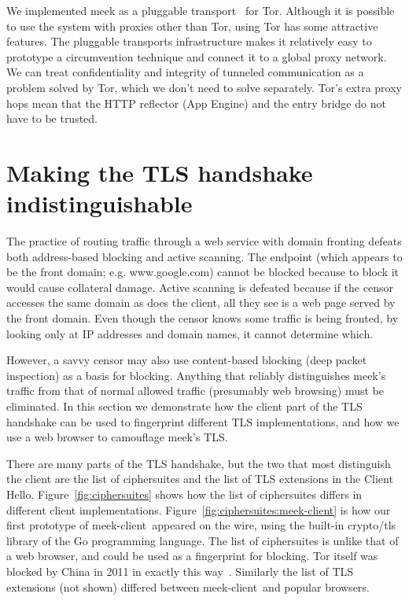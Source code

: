 \documentclass[conference]{IEEEtran}
\def\meekclient{\mbox{meek-client}}
\begin{document}
We implemented meek as a pluggable transport~\cite{pt} for Tor.
Although it is possible to use the system with proxies other than Tor,
using Tor has some attractive features.
The pluggable transports infrastructure makes it relatively easy to prototype
a circumvention technique and connect it to a global proxy network.
We can treat confidentiality and integrity of tunneled communication
as a problem solved by Tor, which we don't need to solve separately.
Tor's extra proxy hops mean that the HTTP reflector (App Engine)
and the entry bridge do not have to be trusted.

\section{Making the TLS handshake indistinguishable}
\label{sec:browserextension}

The practice of routing traffic through a web service with domain fronting
defeats both address-based blocking and active scanning.
The endpoint (which appears to be the front domain; e.g. www.google.com)
cannot be blocked because to block it would cause collateral damage.
Active scanning is defeated because if the censor accesses the same
domain as does the client, all they see is a web page served by the front domain.
Even though the censor knows some traffic is being fronted,
by looking only at IP addresses and domain names, it cannot determine which.

However, a savvy censor may also use content-based blocking
(deep packet inspection) as a basis for blocking.
Anything that reliably distinguishes meek's traffic from that of normal allowed traffic
(presumably web browsing) must be eliminated.
In this section we demonstrate how the client part of the TLS handshake can be used
to fingerprint different TLS implementations,
and how we use a web browser to camouflage meek's TLS.

There are many parts of the TLS handshake, but the two that
most distinguish the client are the list of ciphersuites and the
list of TLS extensions in the Client Hello.
Figure~\ref{fig:ciphersuites} shows how the list of ciphersuites
differs in different client implementations.
Figure~\ref{fig:ciphersuites:meek-client} is how our first prototype of \meekclient\ appeared on the wire,
using the built-in crypto/tls library of the Go programming language.
The list of ciphersuites is unlike that of a web browser,
and could be used as a fingerprint for blocking.
Tor itself was blocked by China in 2011 in exactly this way~\cite{bug4744}.
Similarly the list of TLS extensions (not shown)
differed between \meekclient\ and popular browsers.
\end{document}
